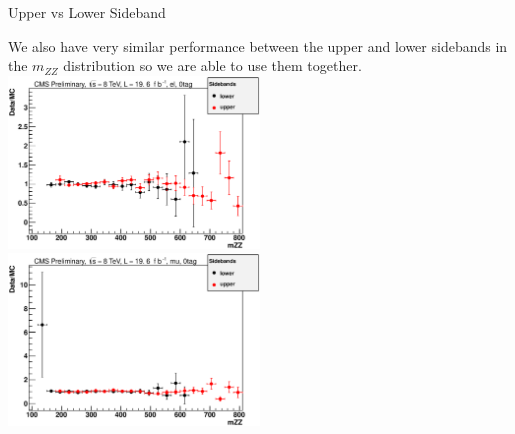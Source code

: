 \begin{frame}{Upper vs Lower Sideband}
\begin{center}
  We also have very similar performance between the upper and lower sidebands in the $m_{ZZ}$ distribution so we are able to use them together.
  \includegraphics[width=0.5\textwidth]{images/sidebands/divide_el_2_0.eps}
   \includegraphics[width=0.5\textwidth]{images/sidebands/divide_mu_2_0.eps}
\end{center}
\end{frame}

